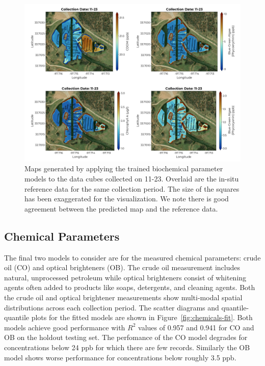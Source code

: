 \documentclass[sensors,article,submit,pdftex,moreauthors]{Definitions/mdpi}
\begin{document}
\begin{figure}
\centering
\includegraphics[width=\columnwidth]{paper/figures/results/maps/biochemical.pdf}
\caption{Maps generated by applying the trained biochemical parameter models to the data cubes collected on 11-23. Overlaid are the in-situ reference data for the same collection period. The size of the squares has been exaggerated for the visualization. We note there is good agreement between the predicted map and the reference data. \label{fig:map-biochem}}
\end{figure}  


\subsection{Chemical Parameters}

The final two models to consider are for the measured chemical parameters: crude oil (CO) and optical brighteners (OB). The crude oil measurement includes natural, unprocessed petroleum while optical brighteners consist of whitening agents often added to products like soaps, detergents, and cleaning agents. Both the crude oil and optical brightener measurements show multi-modal spatial distributions across each collection period. The scatter diagrams and quantile-quantile plots for the fitted models are shown in Figure~\ref{fig:chemicals-fit}. Both models achieve good performance with $R^2$ values of 0.957 and 0.941 for CO and OB on the holdout testing set. The perfomance of the CO model degrades for concentrations below 24 ppb for which there are few records. Similarly the OB model shows worse performance for concentrations below roughly 3.5 ppb.
\end{document}
